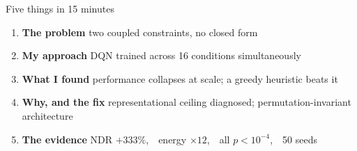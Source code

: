 \documentclass[aspectratio=169,11pt]{beamer}
\newcommand{\emp}[1]{{\color{manpurple}\textbf{#1}}}
\newcommand{\qt}[1]{{\color{muted}#1}}
\begin{document}
\begin{frame}{Five things in 15 minutes}
  \vspace{0.6em}
  \begin{enumerate}\setlength\itemsep{0.55em}
    \item \emp{The problem} \quad
          \qt{two coupled constraints, no closed form}
    \item \emp{My approach} \quad
          \qt{DQN trained across 16 conditions simultaneously}
    \item \emp{What I found} \quad
          \qt{performance collapses at scale; a greedy heuristic beats it}
    \item \emp{Why, and the fix} \quad
          \qt{representational ceiling diagnosed; permutation-invariant architecture}
    \item \emp{The evidence} \quad
          \qt{NDR $+333\%$,\ \ energy ${\times}12$,\ \ all $p<10^{-4}$,\ \ 50 seeds}
  \end{enumerate}
\end{frame}
\end{document}
